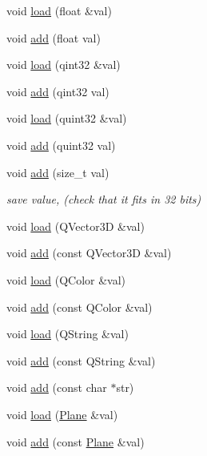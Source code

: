 \begin{DoxyCompactItemize}
\item 
void \hyperlink{classShipCAD_1_1FileBuffer_a525306d68a017ef67ec13c3e8901a8ff}{load} (float \&val)
\item 
void \hyperlink{classShipCAD_1_1FileBuffer_a7909794ac33ad5f695bb670940db99ba}{add} (float val)
\item 
void \hyperlink{classShipCAD_1_1FileBuffer_ad7fc82d31f73f0350715fb63db2fc271}{load} (qint32 \&val)
\item 
void \hyperlink{classShipCAD_1_1FileBuffer_ad5ff9b7299df09feb365250c69e6da9a}{add} (qint32 val)
\item 
void \hyperlink{classShipCAD_1_1FileBuffer_a19fcd1363671552150de3d6ee3297f2c}{load} (quint32 \&val)
\item 
void \hyperlink{classShipCAD_1_1FileBuffer_a1dd1963dd35caff15333f21cc2195b34}{add} (quint32 val)
\item 
void \hyperlink{classShipCAD_1_1FileBuffer_aa22983fa24559f6d0d119d89036100af}{add} (size\+\_\+t val)
\begin{DoxyCompactList}\small\item\em save value, (check that it fits in 32 bits) \end{DoxyCompactList}\item 
void \hyperlink{classShipCAD_1_1FileBuffer_a7255342a053689ebafda9317cc586c57}{load} (Q\+Vector3D \&val)
\item 
void \hyperlink{classShipCAD_1_1FileBuffer_a0642733d14682981c12f6aeaef9bb884}{add} (const Q\+Vector3D \&val)
\item 
void \hyperlink{classShipCAD_1_1FileBuffer_a3329cf81740c79967acc24bc0ac3c9a3}{load} (Q\+Color \&val)
\item 
void \hyperlink{classShipCAD_1_1FileBuffer_a3611327a77cc938e987ecda018d0d936}{add} (const Q\+Color \&val)
\item 
void \hyperlink{classShipCAD_1_1FileBuffer_a82c790d09c8e85c0f9d218efd9c93605}{load} (Q\+String \&val)
\item 
void \hyperlink{classShipCAD_1_1FileBuffer_aea305be34bc316cc5b849fb291499012}{add} (const Q\+String \&val)
\item 
void \hyperlink{classShipCAD_1_1FileBuffer_ab266512b0703e4e62a32cbbcc4dd7050}{add} (const char $\ast$str)
\item 
void \hyperlink{classShipCAD_1_1FileBuffer_a4ae77da0ea26a1ed6de262ff7f3d606f}{load} (\hyperlink{classShipCAD_1_1Plane}{Plane} \&val)
\item 
void \hyperlink{classShipCAD_1_1FileBuffer_ae947c5bac13749a8b0d833bfa7979d0d}{add} (const \hyperlink{classShipCAD_1_1Plane}{Plane} \&val)

\end{DoxyCompactItemize}
